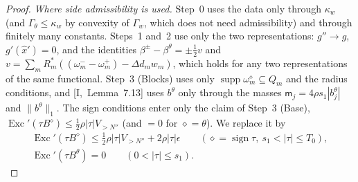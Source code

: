 \documentclass[10pt]{amsart}
\theoremstyle{definition}
\theoremstyle{remark}
\newcommand{\supp}{\operatorname{supp}}
\newcommand{\sgn}{\operatorname{sign}}
\newcommand{\Exc}{\operatorname{Exc}}
\begin{document}
\begin{proof}
\emph{Where side admissibility is used.}  Step~0 uses the data only through
$\kappa_w$ (and $\Gamma_\theta\le\kappa_w$ by convexity of $\Gamma_w$, which
does not need admissibility) and through finitely many constants.  Steps~1
and~2 use only the two representations: $g''\to g$, $g'(\hat x')=0$, and the
identities $\beta^\pm-\beta^\theta=\pm\frac12v$ and $v=\sum_mR_m^*((\omega^-_m-
\omega^+_m)-\Delta d_mw_m)$, which holds for any two representations of the
same functional.  Step~3 (Blocks) uses only $\supp\omega^\diamond_m\subseteq
Q_m$ and the radius conditions, and [I,~Lemma~7.13] uses $b^\theta$ only
through the masses $\mathsf m_j=4\rho s_1|b^\theta_j|$ and $\|b^\theta\|_1$.
The sign conditions enter only the claim of Step~3 (Base),
$\Exc'(\tau B^\diamond)\le\frac12\rho|\tau|V_{>N''}$ (and $=0$ for
$\diamond=\theta$).  We replace it by
\begin{equation}\label{eq:II-VTstar}
 \begin{gathered}
 \Exc'(\tau B^\diamond)\le\tfrac12\rho|\tau|V_{>N''}+2\rho|\tau|\epsilon\qquad
 (\diamond=\sgn\tau,\ s_1<|\tau|\le T_0),\\
 \Exc'(\tau B^\theta)=0\qquad(0<|\tau|\le s_1).
 \end{gathered}
\end{equation}


\end{proof}
\end{document}
